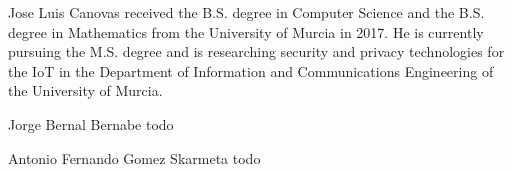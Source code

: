 \documentclass{ieeeaccess}
\begin{document}
\titlepgskip=-15pt

\maketitle
























\begin{IEEEbiography}{Jose Luis Canovas} 
received the B.S. degree in Computer Science and the B.S. degree in Mathematics from the University of Murcia in 2017. He is currently pursuing the M.S. degree and is researching security and privacy technologies for the IoT in the Department of Information and Communications Engineering of the University of Murcia.
\end{IEEEbiography}

\begin{IEEEbiography}{Jorge Bernal Bernabe} todo 
\end{IEEEbiography}

\begin{IEEEbiography}{Antonio Fernando Gomez Skarmeta} todo
\end{IEEEbiography}

\EOD
\end{document}
